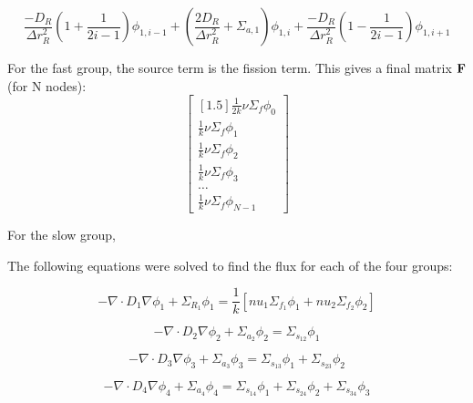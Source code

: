 \documentclass[../main.tex]{subfiles}
\begin{document}
	\begin{equation}
	\frac{-D_R}{\Delta r_R^2} \left( 1 + \frac{1}{2i-1} \right) \phi_{1,i-1} + \left( \frac{2D_R}{\Delta r_R^2} + \Sigma_{a,1} \right) \phi_{1,i} + \frac{-D_R}{\Delta r_R^2} \left( 1 - \frac{1}{2i-1} \right) \phi_{1,i+1}
	\end{equation}
	
For the fast group, the source term  is the fission term.  This gives a final matrix $\mathbf{F}$ (for N nodes):
	\[
	\begin{bmatrix}[1.5]
		\frac{1}{2k} \nu \Sigma_f \phi_0  \\
		\frac{1}{k} \nu \Sigma_f \phi_1  \\
		\frac{1}{k} \nu \Sigma_f \phi_2  \\
		\frac{1}{k} \nu \Sigma_f \phi_3  \\
		\dots \\
		\frac{1}{k} \nu \Sigma_f \phi_{N-1}
	\end{bmatrix}
	\]
	
For the slow group,

The following equations were solved to find the flux for each of the four groups:

\begin{equation*}
		- \nabla \cdot D_{1} \nabla \phi_{1}+ \Sigma_{R_1} \phi_1 = \frac{1}{k} [nu_1 \Sigma_{f_1} \phi_{1} + nu_2 \Sigma_{f_2} \phi_{2}] 
	\end{equation*}
	
	\begin{equation*}
		- \nabla \cdot D_{2} \nabla \phi_{2}+ \Sigma_{a_2} \phi_2 = \Sigma_{s_{12}} \phi_1
	\end{equation*}
	
	\begin{equation*}
		- \nabla \cdot D_{3} \nabla \phi_{3}+ \Sigma_{a_3} \phi_3 = \Sigma_{s_{13}} \phi_1 + \Sigma_{s_{23}} \phi_2
	\end{equation*}
	
	\begin{equation*}
		- \nabla \cdot D_{4} \nabla \phi_{4}+ \Sigma_{a_4} \phi_4 = \Sigma_{s_{14}} \phi_1 + \Sigma_{s_{24}} \phi_2 + \Sigma_{s_{34}} \phi_3
	\end{equation*}
\end{document}
